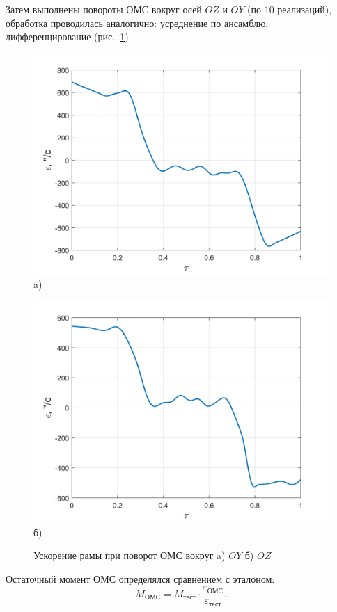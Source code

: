 Затем выполнены повороты ОМС вокруг осей $OZ$ и $OY$ (по 10 реализаций), обработка проводилась аналогично:
усреднение по ансамблю, дифференцирование
(рис.~\cref{fig:oz-gyro}).

\begin{figure}[!h]
	\begin{minipage}[b]{0.49\linewidth}\centering
		\includegraphics[width=0.8\linewidth]{matlab/img/oy-gyro-acc.png}\\[-2pt] a)
	\end{minipage}
	\hfill
	\begin{minipage}[b]{0.49\linewidth}\centering
		\includegraphics[width=0.8\linewidth]{matlab/img/oz-gyro-acc.png}\\[-2pt] б)
	\end{minipage}
	\caption{Ускорение рамы при поворот ОМС вокруг a) $OY$ б) $OZ$}
	\label{fig:oz-gyro}
\end{figure}

Остаточный момент ОМС определялся сравнением с эталоном:
\[
M_{\text{ОМС}} = M_{\text{тест}}\cdot\frac{\varepsilon_{\text{ОМС}}}{\varepsilon_{\text{тест}}}\!.
\]

